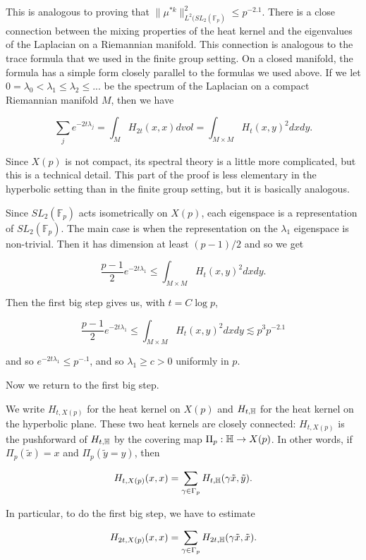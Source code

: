 \documentclass[12pt]{amsart}
\newcommand{\FF}{\mathbb{F}}
\begin{document}
This is analogous to proving that $\| \mu^{*k} \|_{L^2(SL_2(\FF_p)}^2 \le p^{-2.1}$.
There is a close connection between the mixing properties of the heat kernel and the eigenvalues of the Laplacian on a Riemannian manifold.   This connection is analogous to the trace formula that we used in the finite group setting.   On a closed manifold,  the formula has a simple form closely parallel to the formulas we used above.   If we let $0 = \lambda_0 < \lambda_1 \le \lambda_2 \le ... $ be the spectrum of the Laplacian on a compact Riemannian manifold $M$,   then we have

$$ \sum_{j} e^{- 2t \lambda_j} = \int_M H_{2t}(x,x) dvol = \int_{M \times M} H_t(x,y)^2 dx dy. $$

Since $X(p)$ is not compact,  its spectral theory is a little more complicated, but this is a technical detail.  This part of the proof is less elementary in the hyperbolic setting than in the finite group setting,  but it is basically analogous. 

Since $SL_2(\FF_p)$ acts isometrically on $X(p)$,  each eigenspace is a representation of $SL_2(\FF_p)$.   The main case is when the representation on the $\lambda_1$ eigenspace is non-trivial.   Then it has dimension at least $(p-1)/2$ and so we get

$$ \frac{p-1}{2} e^{-2t \lambda_1} \le  \int_{M \times M} H_t(x,y)^2 dx dy. $$

Then the first big step gives us,  with $t = C \log p$, 

$$ \frac{p-1}{2} e^{-2t \lambda_1} \le  \int_{M \times M} H_t(x,y)^2 dx dy \lesssim p^3 p^{-2.1}$$

and so $e^{- 2 t \lambda_1} \le p^{-.1}$, and so $\lambda_1 \ge c > 0$ uniformly in $p$.

Now we return to the first big step.  

We write $H_{t, X(p)}$ for the heat kernel on $X(p)$ and $H_{t, \mathbb{H}}$ for the heat kernel on the hyperbolic plane.   These two heat kernels are closely connected: $H_{t, X(p)}$ is the pushforward of $H_{t, \mathbb{H}}$ by the covering map $\Pi_p: \mathbb{H} \rightarrow X(p)$.    In other words,  if $\Pi_p(\tilde x) = x$ and $\Pi_p(\tilde y = y)$, then

$$H_{t,  X(p)} (x,x) = \sum_{\gamma \in \Gamma_p} H_{t,  \mathbb{H}}(\gamma \tilde x, \tilde y). $$

In particular,  to do the first big step,  we have to estimate 

$$H_{2t, X(p)}(x,x) = \sum_{\gamma \in \Gamma_p} H_{2t,  \mathbb{H}}(\gamma \tilde x, \tilde x). $$
\end{document}
